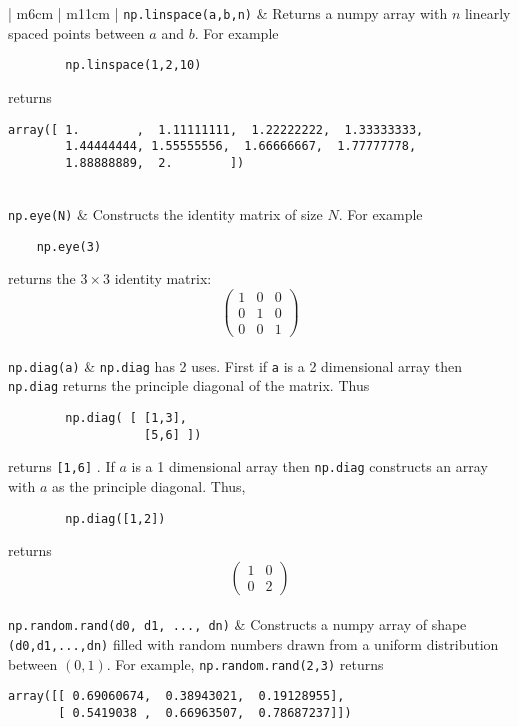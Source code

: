 \documentclass[]{article}
\begin{document}
\begin{longtable}{ | m{6cm}  | m{11cm} |}
	\texttt{np.linspace(a,b,n)} & Returns a numpy array with $n$ linearly spaced points between $a$ and $b$.  For example
	\begin{verbatim}
		np.linspace(1,2,10) 
	\end{verbatim}
    returns
	\begin{verbatim}
array([ 1.        ,  1.11111111,  1.22222222,  1.33333333,
        1.44444444, 1.55555556,  1.66666667,  1.77777778, 
        1.88888889,  2.        ])
	\end{verbatim}
	\\\hline
	\texttt{np.eye(N)} & Constructs the identity matrix of size $N$.  For example  
	\begin{verbatim}
    np.eye(3)
	\end{verbatim}
    returns the $3\times 3$ identity matrix:
	\[
		\left(\begin{matrix}1&0&0\\0&1&0\\ 0&0&1\end{matrix}\right)
	\]\\\hline
	\texttt{np.diag(a)} & {\texttt{np.diag} } has 2 uses.  First if {\texttt{a}} is a 2 dimensional array then \texttt{np.diag} returns the principle diagonal of the matrix.  Thus
	\begin{verbatim}
        np.diag( [ [1,3],
                   [5,6] ])
	\end{verbatim} 
    returns {\texttt{[1,6]} }.  If $a$ is a 1 dimensional array then {\texttt{np.diag} } constructs an array with $a$ as the principle diagonal.  Thus,
	\begin{verbatim}
        np.diag([1,2])
	\end{verbatim}
    returns
	\[
		\left(\begin{matrix}1&0\\0&2\end{matrix}\right)
	\]\\\hline
	\texttt{np.random.rand(d0, d1, ..., dn)} & Constructs a numpy array of shape {\texttt{(d0,d1,...,dn)} } filled with random numbers drawn from a uniform distribution between $(0,1)$.  For example, {\texttt{np.random.rand(2,3)} } returns
	\begin{verbatim}
array([[ 0.69060674,  0.38943021,  0.19128955],
       [ 0.5419038 ,  0.66963507,  0.78687237]])
	\end{verbatim}
	\\\hline

\end{longtable}
\end{document}
